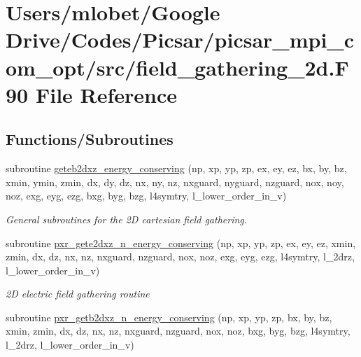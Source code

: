 \hypertarget{field__gathering__2d_8_f90}{}\section{Users/mlobet/\+Google Drive/\+Codes/\+Picsar/picsar\+\_\+mpi\+\_\+com\+\_\+opt/src/field\+\_\+gathering\+\_\+2d.F90 File Reference}
\label{field__gathering__2d_8_f90}
\subsection*{Functions/\+Subroutines}
\begin{DoxyCompactItemize}
\item 
subroutine \hyperlink{field__gathering__2d_8_f90_a6d4781dd6cacd0867443a1d9ff142ad7}{geteb2dxz\+\_\+energy\+\_\+conserving} (np, xp, yp, zp, ex, ey, ez, bx, by, bz, xmin, ymin, zmin, dx, dy, dz, nx, ny, nz, nxguard, nyguard, nzguard,                                                                                                                                                       nox, noy, noz, exg, eyg, ezg, bxg, byg, bzg, l4symtry, l\+\_\+lower\+\_\+order\+\_\+in\+\_\+v)
\begin{DoxyCompactList}\small\item\em General subroutines for the 2D cartesian field gathering. \end{DoxyCompactList}\item 
subroutine \hyperlink{field__gathering__2d_8_f90_ab93a0f4d8c25f1ff4ec81319daea39e2}{pxr\+\_\+gete2dxz\+\_\+n\+\_\+energy\+\_\+conserving} (np, xp, yp, zp, ex, ey, ez, xmin, zmin, dx, dz, nx, nz, nxguard, nzguard,                                                                                                                                                       nox, noz, exg, eyg, ezg, l4symtry, l\+\_\+2drz, l\+\_\+lower\+\_\+order\+\_\+in\+\_\+v)
\begin{DoxyCompactList}\small\item\em 2D electric field gathering routine \end{DoxyCompactList}\item 
subroutine \hyperlink{field__gathering__2d_8_f90_aa70004798c24521d5eb8c929aa0d556b}{pxr\+\_\+getb2dxz\+\_\+n\+\_\+energy\+\_\+conserving} (np, xp, yp, zp, bx, by, bz, xmin, zmin, dx, dz, nx, nz, nxguard, nzguard,                                                                                                                                                       nox, noz, bxg, byg, bzg, l4symtry, l\+\_\+2drz, l\+\_\+lower\+\_\+order\+\_\+in\+\_\+v)

\end{DoxyCompactItemize}
